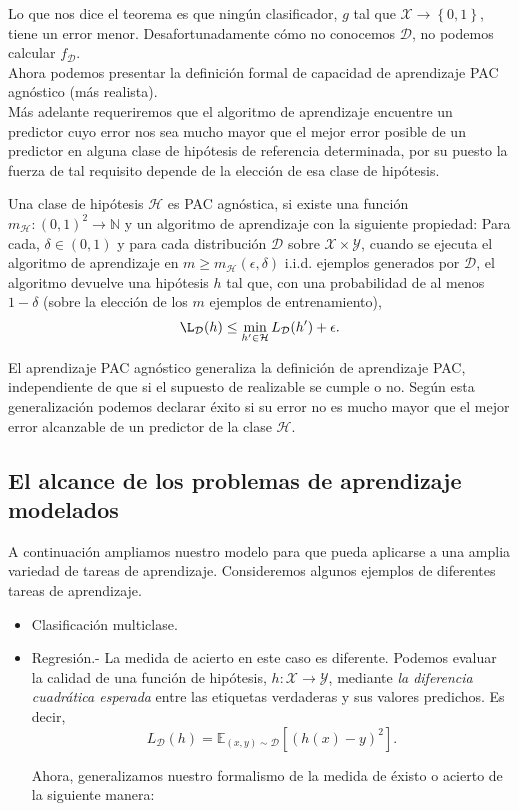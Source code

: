 Lo que nos dice el teorema es que ningún clasificador, $g$ tal que $\mathcal{X} \to \left\{0,1\right\}$, tiene un error menor. Desafortunadamente cómo no conocemos $\mathcal{D}$, no podemos calcular $f_{\mathcal{D}}$.\\

Ahora podemos presentar la definición formal de capacidad de aprendizaje PAC agnóstico (más realista). \\

Más adelante requeriremos que el algoritmo de aprendizaje encuentre un predictor cuyo error nos sea mucho mayor que el mejor error posible de un predictor en alguna clase de hipótesis de referencia determinada, por su puesto la fuerza de tal requisito depende de la elección de esa clase de hipótesis.


\begin{def.} Una clase de hipótesis $\mathcal{H}$ es PAC agnóstica, si existe una función $m_\mathcal{H} : (0, 1)^2 \to \mathbb{N}$ y un algoritmo de aprendizaje con la siguiente propiedad: Para cada, $\delta \in (0, 1)$ y para cada distribución $\mathcal{D}$ sobre $\mathcal{X} \times \mathcal{Y}$, cuando se ejecuta el algoritmo de aprendizaje en $m \geq m_\mathcal{H}(\epsilon, \delta)$ i.i.d. ejemplos generados por $\mathcal{D}$, el algoritmo devuelve una hipótesis $h$ tal que, con una probabilidad de al menos $1 - \delta$ (sobre la elección de los $m$ ejemplos de entrenamiento),
    $$\L_{\mathcal{D}}(h) \leq \min_{h'\in \mathcal{H}} L_{\mathcal{D}}(h') + \epsilon.$$
\end{def.}

El aprendizaje PAC agnóstico generaliza la definición de aprendizaje PAC, independiente de que si el supuesto de realizable se cumple o no. Según esta generalización podemos declarar éxito si su error no es mucho mayor que el mejor error alcanzable de un predictor de la clase $\mathcal{H}$.

\subsection{El alcance de los problemas de aprendizaje modelados}
A continuación ampliamos nuestro modelo para que pueda aplicarse a una amplia variedad de tareas de aprendizaje. Consideremos algunos ejemplos de diferentes tareas de aprendizaje.

\begin{itemize}
    \item Clasificación multiclase.
    \item Regresión.- La medida de acierto en este caso es diferente. Podemos evaluar la calidad de una función de hipótesis, $h:\mathcal{X}\to \mathcal{Y}$, mediante \textit{la diferencia cuadrática esperada} entre las etiquetas verdaderas y sus valores predichos. Es decir,
\begin{equation}
    L_{\mathcal{D}}(h) = \mathbb{E}_{(x,y)\sim \mathcal{D}}\left[(h(x)-y)^2\right].
\end{equation}

Ahora, generalizamos nuestro formalismo de la medida de éxisto o acierto de la siguiente manera:
\end{itemize}


